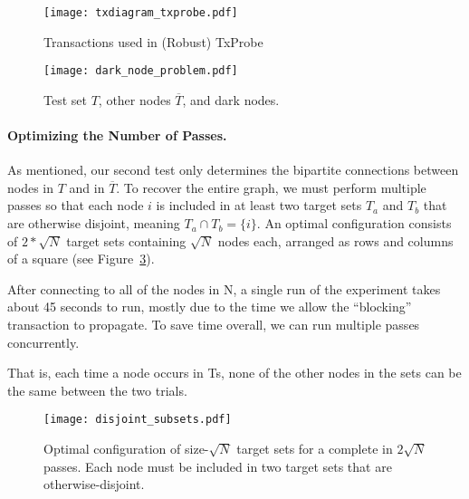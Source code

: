 \begin{figure}
\label{fig:preparedtransactions}
\centering
\texttt{[image: txdiagram\_txprobe.pdf]}
\caption{Transactions used in (Robust) TxProbe}
\end{figure}


\begin{figure}
\centering
\texttt{[image: dark\_node\_problem.pdf]}
\caption{Test set $T$, other nodes $\overline{T}$, and dark nodes.}
\label{fig:darknodes}
\end{figure}

\paragraph{Optimizing the Number of Passes.}
As mentioned, our second test only determines the bipartite connections between nodes in $T$ and in $\overline{T}$. To recover the entire graph, we must perform multiple passes so that each node $i$ is included in at least two target sets $T_a$ and $T_b$ that are otherwise disjoint, meaning $T_a \cap T_b = \{i\}$. An optimal configuration consists of $2*\sqrt{N}$ target sets containing $\sqrt{N}$ nodes each, arranged as rows and columns of a square (see Figure~\ref{fig:square}).

After connecting to all of the nodes in N, a single run of the experiment takes about 45 seconds to run, mostly due to the time we allow the ``blocking'' transaction to propagate.
To save time overall, we can run multiple passes concurrently.

That is, each time a node occurs in Ts, none of the other nodes in the sets can be the same between the two trials.  


\begin{figure}
\centering
\texttt{[image: disjoint\_subsets.pdf]}
\caption{Optimal configuration of size-$\sqrt{N}$ target sets for a complete in $2\sqrt{N}$ passes. Each node must be included in two target sets that are otherwise-disjoint.}
\label{fig:square}
\end{figure}



